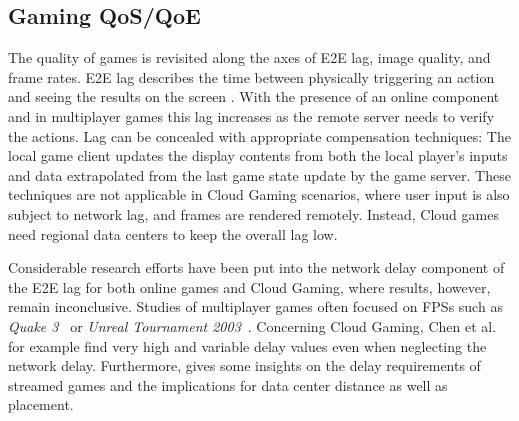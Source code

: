 




\subsection{Gaming QoS/QoE}


The quality of games is revisited along the axes of \gls{E2E} lag, image quality, and frame rates. \gls{E2E} lag describes the time between physically triggering an action and seeing the results on the screen \cite{metzger16lagmodel}. With the presence of an online component and in multiplayer games this lag increases as the remote server needs to verify the actions. Lag can be concealed with appropriate compensation techniques: The local game client updates the display contents from both the local player's inputs and data extrapolated from the last game state update by the game server. These techniques are not applicable in Cloud Gaming scenarios, where user input is also subject to network lag, and frames are rendered remotely. Instead, Cloud games need regional data centers to keep the overall lag low.

Considerable research efforts have been put into the network delay component of the \gls{E2E} lag for both online games and Cloud Gaming, where results, however, remain inconclusive. Studies of multiplayer games often focused on \glspl{FPS} such as \textit{Quake 3}~\cite{1266180} or \textit{Unreal Tournament 2003}~\cite{Beigbeder:2004:ELL:1016540.1016556}. Concerning Cloud Gaming, Chen et al.~\cite{6670099} for example find very high and variable delay values even when neglecting the network delay. Furthermore, \cite{Choy:2012:BSC:2501560.2501563} gives some insights on the delay requirements of streamed games and the implications for data center distance as well as placement.

